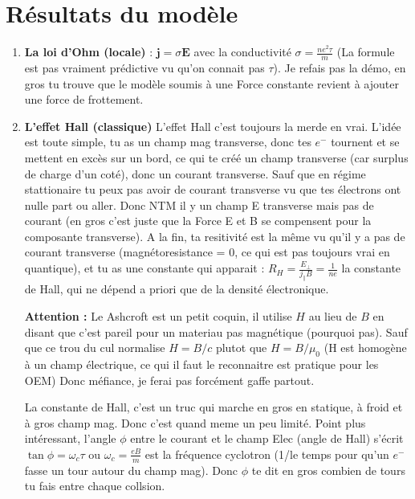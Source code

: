 \documentclass[a4paper]{report}
\begin{document}
  \section{Résultats du modèle}
  \begin{enumerate}
  
  \item \textbf{La loi d'Ohm (locale)} : $\mathbf{j}=\sigma\mathbf{E}$ avec la conductivité $\sigma = \frac{ne^2\tau}{m}$ (La formule est pas vraiment prédictive vu qu'on connait pas $\tau$). Je refais pas la démo, en gros tu trouve que le modèle soumis à une Force constante revient à ajouter une force de frottement.
  
  \item \textbf{L'effet Hall (classique)} L'effet Hall c'est toujours la merde en vrai. L'idée est toute simple, tu as un champ mag transverse, donc tes $e^-$ tournent et se mettent en excès sur un bord, ce qui te créé un champ transverse (car surplus de charge d'un coté), donc un courant transverse. Sauf que en régime stattionaire tu peux pas avoir de courant transverse vu que tes électrons ont nulle part ou aller. Donc NTM il y un champ E transverse mais pas de courant (en gros c'est juste que la Force E et B se compensent pour la composante transverse). A la fin, ta resitivité est la même vu qu'il y a pas de courant transverse (magnétoresistance = 0, ce qui est pas toujours vrai en quantique), et tu as une constante qui apparait : $R_H=\frac{E_\perp}{j_\parallel B}=\frac{1}{ne}$ la constante de Hall, qui ne dépend a priori que de la densité électronique. 
  
  \begin{tcolorbox}
  \textbf{Attention :} Le Ashcroft est un petit coquin, il utilise $H$ au lieu de $B$ en disant que c'est pareil pour un materiau pas magnétique (pourquoi pas). Sauf que ce trou du cul normalise $H=B/c$ plutot que $H=B/\mu_0$ (H est homogène à un champ électrique, ce qui il faut le reconnaitre est pratique pour les OEM) Donc méfiance, je ferai pas forcément gaffe partout.
 \end{tcolorbox}
 
 La constante de Hall, c'est un truc qui marche en gros en statique, à froid et à gros champ mag. Donc c'est quand meme un peu limité.
 Point plus intéressant, l'angle $\phi$ entre le courant et le champ Elec (angle de Hall) s'écrit $\tan \phi = \omega_c \tau$ ou $\omega_c=\frac{eB}{m}$ est la fréquence cyclotron (1/le temps pour qu'un  $e^-$ fasse un tour autour du champ mag). Donc $\phi$ te dit en gros combien de tours tu fais entre chaque collsion.
 

\end{enumerate}
\end{document}

